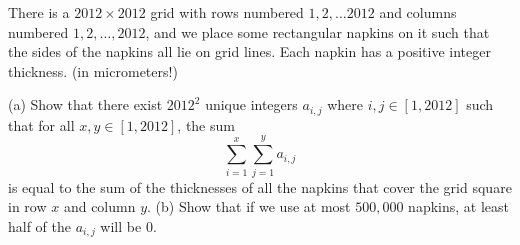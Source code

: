 There is a $2012\times 2012$ grid with rows numbered $1,2,\dots 2012$ and columns numbered $1,2,\dots, 2012$, and we place some rectangular napkins on it such that the sides of the napkins all lie on grid lines. Each napkin has a positive integer thickness. (in micrometers!)

(a) Show that there exist $2012^2$ unique integers $a_{i,j}$ where $i,j \in [1,2012]$ such that for all $x,y\in [1,2012]$, the sum \[ \sum _{i=1}^{x} \sum_{j=1}^{y} a_{i,j} \] is equal to the sum of the thicknesses of all the napkins that cover the grid square in row $x$ and column $y$.
(b) Show that if we use at most $500,000$ napkins, at least half of the $a_{i,j}$ will be $0$.

